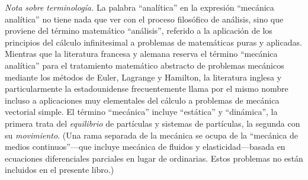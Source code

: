 \documentclass[12pt,a4paper]{book}
\begin{document}
\bigskip

\textit{Nota sobre terminolog\'ia.} La palabra ``anal\'itica'' en la expresi\'on ``mec\'anica anal\'itica'' no tiene nada que ver con el proceso filos\'ofico de an\'alisis, sino que proviene del t\'ermino matem\'atico ``an\'alisis'', referido a la aplicaci\'on de los principios del c\'alculo infinitesimal a problemas de matem\'aticas puras y aplicadas. Mientras que la literatura francesa y alemana reserva el t\'ermino ``mec\'anica anal\'itica'' para el tratamiento matem\'atico abstracto de problemas mec\'anicos mediante los m\'etodos de Euler, Lagrange y Hamilton, la literatura inglesa y particularmente la estadounidense frecuentemente llama por el mismo nombre incluso a aplicaciones muy elementales del c\'alculo a problemas de mec\'anica vectorial simple. El t\'ermino ``mec\'anica'' incluye ``est\'atica'' y ``din\'amica'', la primera trata del \textit{equilibrio} de part\'iculas y sistemas de part\'iculas, la segunda con su \textit{movimiento}. (Una rama separada de la mec\'anica se ocupa de la ``mec\'anica de medios continuos''---que incluye mec\'anica de fluidos y elasticidad---basada en ecuaciones diferenciales parciales en lugar de ordinarias. Estos problemas no est\'an incluidos en el presente libro.)

\bigskip
\end{document}
